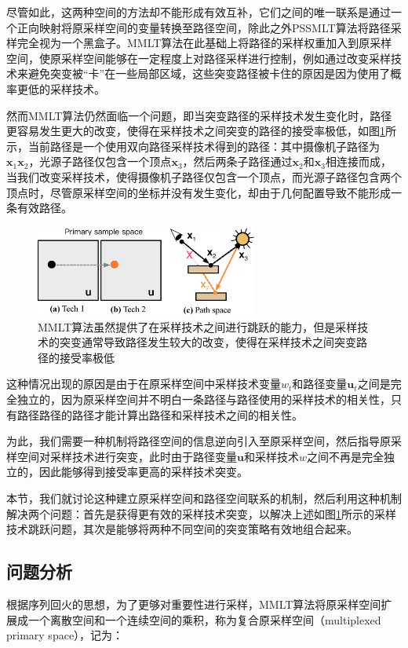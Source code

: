 尽管如此，这两种空间的方法却不能形成有效互补，它们之间的唯一联系是通过一个正向映射将原采样空间的变量转换至路径空间，除此之外PSSMLT算法将路径采样完全视为一个黑盒子。MMLT算法在此基础上将路径的采样权重加入到原采样空间，使原采样空间能够在一定程度上对路径采样进行控制，例如通过改变采样技术来避免突变被“卡”在一些局部区域，这些突变路径被卡住的原因是因为使用了概率更低的采样技术。

然而MMLT算法仍然面临一个问题，即当突变路径的采样技术发生变化时，路径更容易发生更大的改变，使得在采样技术之间突变的路径的接受率极低，如图\ref{f:mlt-disruptive-changes}所示，当前路径是一个使用双向路径采样技术得到的路径：其中摄像机子路径为$\mathbf{x}_1\mathbf{x}_2$，光源子路径仅包含一个顶点$\mathbf{x}_3$，然后两条子路径通过$\mathbf{x}_2$和$\mathbf{x}_3$相连接而成，当我们改变采样技术，使得摄像机子路径仅包含一个顶点，而光源子路径包含两个顶点时，尽管原采样空间的坐标并没有发生变化，却由于几何配置导致不能形成一条有效路径。

\begin{figure}
	\sidecaption
	\includegraphics[width=0.65\textwidth]{figures/mlt/disruptive-changes}
	\caption{MMLT算法虽然提供了在采样技术之间进行跳跃的能力，但是采样技术的突变通常导致路径发生较大的改变，使得在采样技术之间突变路径的接受率极低}
	\label{f:mlt-disruptive-changes}
\end{figure}

这种情况出现的原因是由于在原采样空间中采样技术变量$w_t$和路径变量$\mathbf{u}_t$之间是完全独立的，因为原采样空间并不明白一条路径与路径使用的采样技术的相关性，只有路径路径的路径才能计算出路径和采样技术之间的相关性。

为此，我们需要一种机制将路径空间的信息逆向引入至原采样空间，然后指导原采样空间对采样技术进行突变，此时由于路径变量$\mathbf{u}$和采样技术$w$之间不再是完全独立的，因此能够得到接受率更高的采样技术突变。

本节，我们就讨论这种建立原采样空间和路径空间联系的机制，然后利用这种机制解决两个问题：首先是获得更有效的采样技术突变，以解决上述如图\ref{f:mlt-disruptive-changes}所示的采样技术跳跃问题，其次是能够将两种不同空间的突变策略有效地组合起来。




\subsection{问题分析}
根据序列回火的思想，为了更够对重要性进行采样，MMLT算法将原采样空间扩展成一个离散空间和一个连续空间的乘积，称为复合原采样空间（multiplexed primary space），记为：

